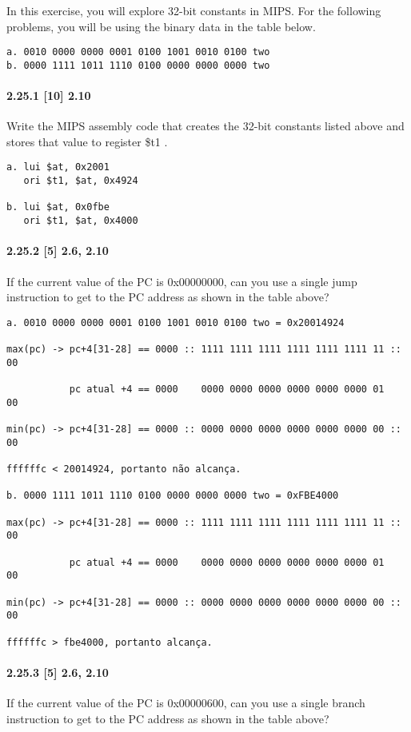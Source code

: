 \documentclass{article}
\begin{document}
In this exercise, you will explore 32-bit constants in MIPS. For the following
problems, you will be using the binary data in the table below.

\begin{verbatim}
a. 0010 0000 0000 0001 0100 1001 0010 0100 two
b. 0000 1111 1011 1110 0100 0000 0000 0000 two
\end{verbatim}

\paragraph{2.25.1  [10] 2.10} Write the MIPS assembly code that creates the
32-bit constants listed above and stores that value to register \$t1 .

\begin{verbatim}
a. lui $at, 0x2001
   ori $t1, $at, 0x4924

b. lui $at, 0x0fbe
   ori $t1, $at, 0x4000
\end{verbatim}

\paragraph{2.25.2 [5] 2.6, 2.10} If the current value of the PC is 0x00000000,
can you use a single jump instruction to get to the PC address as shown in the
table above?

\begin{verbatim}
a. 0010 0000 0000 0001 0100 1001 0010 0100 two = 0x20014924

max(pc) -> pc+4[31-28] == 0000 :: 1111 1111 1111 1111 1111 1111 11 :: 00

           pc atual +4 == 0000    0000 0000 0000 0000 0000 0000 01    00

min(pc) -> pc+4[31-28] == 0000 :: 0000 0000 0000 0000 0000 0000 00 :: 00

ffffffc < 20014924, portanto não alcança.

b. 0000 1111 1011 1110 0100 0000 0000 0000 two = 0xFBE4000

max(pc) -> pc+4[31-28] == 0000 :: 1111 1111 1111 1111 1111 1111 11 :: 00

           pc atual +4 == 0000    0000 0000 0000 0000 0000 0000 01    00

min(pc) -> pc+4[31-28] == 0000 :: 0000 0000 0000 0000 0000 0000 00 :: 00

ffffffc > fbe4000, portanto alcança.
\end{verbatim}

\paragraph{2.25.3 [5] 2.6, 2.10} If the current value of the PC is 0x00000600,
can you use a single branch instruction to get to the PC address as shown in
the table above?
\end{document}
